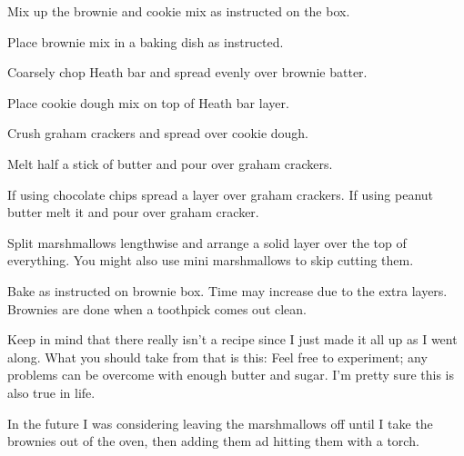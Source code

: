 \begin{preparation}
\item Mix up the brownie and cookie mix as instructed on the box.

\item Place brownie mix in a baking dish as instructed.

\item Coarsely chop Heath bar and spread evenly over brownie batter.

\item Place cookie dough mix on top of Heath bar layer.

\item Crush graham crackers and spread over cookie dough.

\item Melt half a stick of butter and pour over graham crackers.

\item If using chocolate chips spread a layer over graham crackers.
    If using peanut butter melt it and pour over graham cracker.

\item Split marshmallows lengthwise and arrange a solid layer over the top of
    everything.
    You might also use mini marshmallows to skip cutting them.

\item Bake as instructed on brownie box. Time may increase due to the extra layers.
    Brownies are done when a toothpick comes out clean.
\end{preparation}

\begin{experiments}
\item Keep in mind that there really isn't a recipe since I just made it all
    up as I went along. What you should take from that is this: Feel free to
    experiment; any problems can be overcome with enough butter and sugar.
    I'm pretty sure this is also true in life.

\item In the future I was considering leaving the marshmallows off until I
    take the brownies out of the oven, then adding them ad hitting them with a torch.
\end{experiments}

\recipeend%
